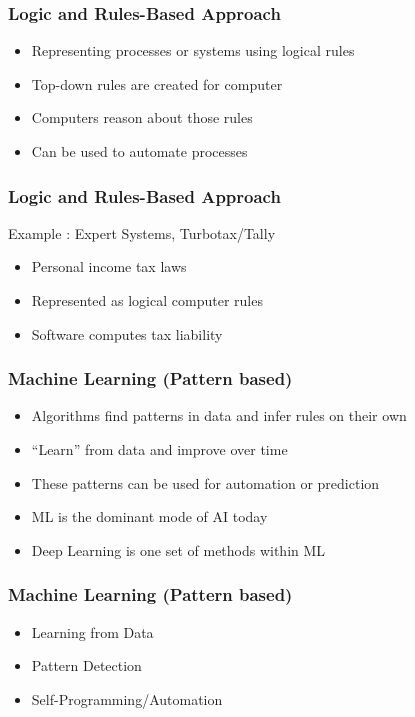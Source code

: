 \begin{frame}[fragile]\frametitle{Logic and Rules-Based Approach}
\begin{itemize}
\item  Representing processes or systems using logical rules
\item Top-down rules are created for computer
\item Computers reason about those rules
\item Can be used to automate processes
\end{itemize}
\end{frame}

\begin{frame}[fragile]\frametitle{Logic and Rules-Based Approach}
Example :  Expert Systems, Turbotax/Tally
\begin{itemize}
\item  Personal income tax laws 
\item  Represented as logical computer rules
\item  Software computes tax liability
\end{itemize}
\end{frame}

\begin{frame}[fragile]\frametitle{Machine Learning (Pattern based)}
\begin{itemize}
\item  Algorithms find patterns in data and infer rules on their own
\item   ``Learn'' from data and improve over time
\item  These patterns can be used for automation or prediction
\item  ML is the dominant mode of AI today
\item Deep Learning is one set of methods within ML
\end{itemize}
\end{frame}

\begin{frame}[fragile]\frametitle{Machine Learning (Pattern based)}
\begin{itemize}
\item Learning from Data
\item Pattern Detection
\item Self-Programming/Automation
\end{itemize}
\end{frame}

